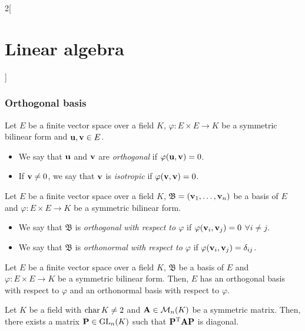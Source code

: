 \documentclass[../../../main.tex]{subfiles}
\begin{document}
\begin{multicols}{2}[\section{Linear algebra}]
\subsubsection*{Orthogonal basis}
\begin{definition}\label{ALG-isotrop}
    Let $E$ be a finite vector space over a field $K$, $\varphi:E\times E\rightarrow K$ be a symmetric bilinear form and $\vb{u},\vb{v}\in E$. 
    \begin{itemize}
        \item We say that $\vb{u}$ and $\vb{v}$ are \textit{orthogonal} if $\varphi(\vb{u},\vb{v})=0$.
        \item If $\vb{v}\ne 0$, we say that $\vb{v}$ is \textit{isotropic} if $\varphi(\vb{v},\vb{v})=0$.
    \end{itemize} 
\end{definition}
\begin{definition}
    Let $E$ be a finite vector space over a field $K$, $\mathfrak{B}=(\vb{v}_1,\ldots,\vb{v}_n)$ be a basis of $E$ and $\varphi:E\times E\rightarrow K$ be a symmetric bilinear form.
    \begin{itemize}
        \item We say that $\mathfrak{B}$ is \textit{orthogonal with respect to $\varphi$} if $\varphi(\vb{v}_i,\vb{v}_j)=0$ $\forall i\ne j$.
        \item We say that $\mathfrak{B}$ is \textit{orthonormal with respect to $\varphi$} if $\varphi(\vb{v}_i,\vb{v}_j)=\delta_{ij}$.
    \end{itemize}
\end{definition}
\begin{theorem}
    Let $E$ be a finite vector space over a field $K$, $\mathfrak{B}$ be a basis of $E$ and $\varphi:E\times E\rightarrow K$ be a symmetric bilinear form. Then, $E$ has an orthogonal basis with respect to $\varphi$ and an orthonormal basis with respect to $\varphi$.
\end{theorem}
\begin{corollary}
    Let $K$ be a field with $\operatorname{char} K\ne 2$ and $\vb{A}\in\mathcal{M}_n(K)$ be a symmetric matrix. Then, there exists a matrix $\vb{P}\in\mathrm{GL}_n(K)$ such that $\vb{P}^{\mathrm{T}}\vb{A}\vb{P}$ is diagonal.
\end{corollary}

\end{multicols}
\end{document}

